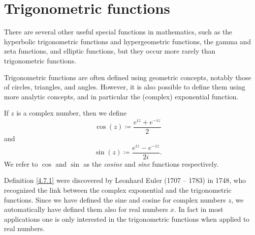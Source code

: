 \section{Trigonometric functions}\label{sec 4.7}

\begin{note}
    There are several other useful special functions in mathematics, such as the hyperbolic trigonometric functions and hypergeometric functions, the gamma and zeta functions, and elliptic functions, but they occur more rarely than trigonometric functions.
\end{note}

\begin{note}
    Trigonometric functions are often defined using geometric concepts, notably those of circles, triangles, and angles.
    However, it is also possible to define them using more analytic concepts, and in particular the (complex) exponential function.
\end{note}

\begin{definition}\label{4.7.1}
    If \(z\) is a complex number, then we define
    \[
        \cos(z) \coloneqq \frac{e^{iz} + e^{-iz}}{2}
    \]
    and
    \[
        \sin(z) \coloneqq \frac{e^{iz} - e^{-iz}}{2i}.
    \]
    We refer to \(\cos\) and \(\sin\) as the \emph{cosine} and \emph{sine} functions respectively.
\end{definition}

\begin{note}
    Definition \ref{4.7.1} were discovered by Leonhard Euler (1707 -- 1783) in 1748, who recognized the link between the complex exponential and the trigonometric functions.
    Since we have defined the sine and cosine for complex numbers \(z\), we automatically have defined them also for real numbers \(x\).
    In fact in most applications one is only interested in the trigonometric functions when applied to real numbers.
\end{note}

